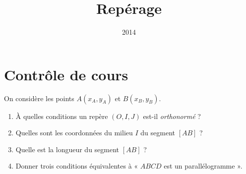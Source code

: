 \documentclass[14pt, aspectratio=169]{beamer}
\institute{Lycée Marie Curie}
\date{2014}
\title{Repérage}
\begin{document}
\section{Contrôle de cours}
\begin{frame}
\end{frame}

\begin{frame}
  On considère les points $A\left( x_A,y_A \right)$ et $B\left( x_B,y_B \right)$.
  \begin{enumerate}
    \item À quelles conditions un repère $(O,I,J)$ est-il \emph{orthonormé} ?
    \item Quelles sont les coordonnées du milieu $I$ du segment $[AB]$ ?
    \item Quelle est la longueur du segment $[AB]$ ?
    \item Donner trois conditions équivalentes à « $ABCD$ est un parallélogramme ».
  \end{enumerate}
\end{frame}
\end{document}
